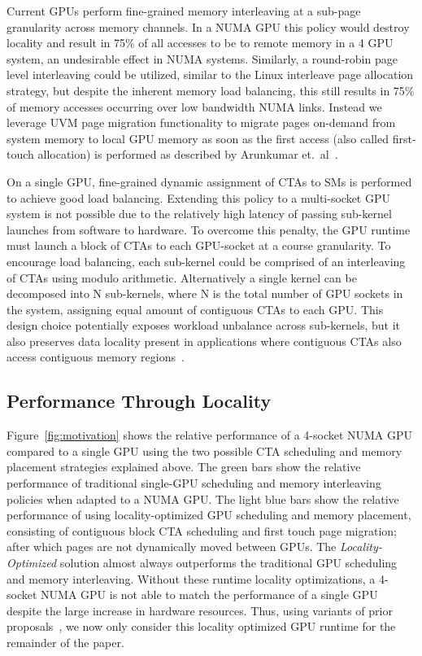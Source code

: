 Current GPUs perform fine-grained memory interleaving at a sub-page granularity 
across memory channels.  In a NUMA GPU this policy would destroy locality and 
result in 75\% of all accesses to be to remote memory in a 4 GPU system, an 
undesirable effect in NUMA systems.  Similarly, a round-robin page level 
interleaving could be utilized, similar to the Linux interleave page allocation 
strategy, but despite the inherent memory load balancing, this still results in 
75\% of memory accesses occurring over low bandwidth NUMA links. Instead we 
leverage UVM page migration functionality to migrate pages on-demand from system 
memory to local GPU memory as soon as the first access (also called first-touch 
allocation) is performed as described by Arunkumar et.~al~\cite{Arunkumar2017}.

On a single GPU, fine-grained dynamic assignment of CTAs to SMs is performed to 
achieve good load balancing.  Extending this policy to a multi-socket GPU 
system is not possible due to the relatively high latency of passing sub-kernel 
launches from software to hardware.  To overcome this penalty, the GPU runtime 
must launch a block of CTAs to each GPU-socket at a course granularity.  To 
encourage load balancing, each sub-kernel could be comprised of an interleaving 
of CTAs using modulo arithmetic.  Alternatively a single kernel can be 
decomposed into N sub-kernels, where N is the total number of GPU sockets in 
the system, assigning equal amount of contiguous CTAs to each GPU.  This design 
choice potentially exposes workload unbalance across sub-kernels, but it also preserves data locality present in applications where contiguous 
CTAs also access contiguous memory regions~\cite{Cabezas2015,Arunkumar2017}.

\subsection{Performance Through Locality} 

Figure~\ref{fig:motivation} shows the relative performance of a 4-socket NUMA 
GPU compared to a single GPU using the two possible CTA scheduling and 
memory placement strategies explained above.  The green bars show the 
relative performance of traditional single-GPU scheduling and memory 
interleaving policies when adapted to a NUMA GPU. The light blue bars
show the relative performance of using locality-optimized GPU scheduling and 
memory placement, consisting of contiguous block CTA scheduling and first touch 
page migration; after which pages are not dynamically moved between GPUs. 
The \textit{Locality-Optimized} 
solution almost always outperforms the traditional GPU scheduling and memory 
interleaving.  Without these runtime locality optimizations, a 4-socket NUMA 
GPU is not able to match the performance of a single GPU despite the large 
increase in hardware resources.  Thus, using variants of prior 
proposals~\cite{Cabezas2015,Arunkumar2017}, we now only consider this locality 
optimized GPU runtime for the remainder of the paper.

